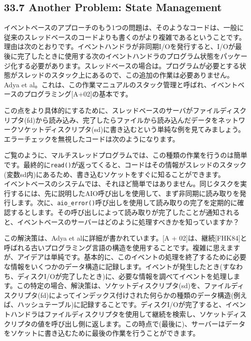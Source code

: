\hypertarget{another-problem-state-management}{%
\subsection*{33.7 Another Problem: State
Management}\label{another-problem-state-management}}

イベントベースのアプローチのもう1つの問題は、そのようなコードは、一般に従来のスレッドベースのコードよりも書くのがより複雑であるということです。理由は次のとおりです。イベントハンドラが非同期I/Oを発行すると、I/Oが最後に完了したときに使用する次のイベントハンドラのプログラム状態をパッケージ化する必要があります。スレッドベースの場合は。プログラムが必要とする状態がスレッドのスタック上にあるので、この追加の作業は必要ありません。Adya
et
al。これは、この作業マニュアルのスタック管理と呼ばれ、イベントベースのプログラミング{[}A+02{]}の基本です。

この点をより具体的にするために、スレッドベースのサーバがファイルディスクリプタ(fd)から読み込み、完了したらファイルから読み込んだデータをネットワークソケットディスクリプタ(sd)に書き込むという単純な例を見てみましょう。エラーチェックを無視したコードは次のようになります。

\begin{Shaded}
\begin{Highlighting}[]
\end{Highlighting}
\end{Shaded}

ご覧のように、マルチスレッドプログラムでは、この種類の作業を行うのは簡単です。最終的に\texttt{read()}が返ってくると、コードはその情報がスレッドのスタック(変数sd内)にあるため、書き込むソケットをすぐに知ることができます。\\
イベントベースのシステムでは、それほど簡単ではありません。同じタスクを実行するには、先に説明したAIO呼び出しを使用して、まず非同期に読み取りを発行します。次に、\texttt{aio\_error()}呼び出しを使用して読み取りの完了を定期的に確認するとします。その呼び出しによって読み取りが完了したことが通知されると、イベントベースのサーバーはどのように処理すべきかを知っていますか？

この解決策は、Adya et alに詳細が書かれています。{[}A +
02{]}は、継続{[}FHK84{]}と呼ばれる古いプログラミング言語の構造を使用することです。複雑に思えますが、アイデアは単純です。基本的に、このイベントの処理を終了するために必要な情報をいくつかのデータ構造に記録します。イベントが発生したとき(すなわち、ディスクI/Oが完了したとき)に、必要な情報を調べてイベントを処理します。この特定の場合、解決策は、ソケットディスクリプタ(sd)を、ファイルディスクリプタ(fd)によってインデックス付けされた何らかの種類のデータ構造(例えば、ハッシュテーブル)に記録することです。ディスクI/Oが完了すると、イベントハンドラはファイルディスクリプタを使用して継続を検索し、ソケットディスクリプタの値を呼び出し側に返します。この時点で(最後に)、サーバーはデータをソケットに書き込むために最後の作業を行うことができます。

